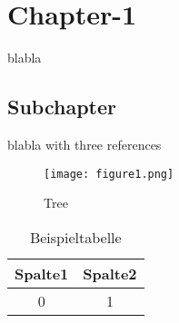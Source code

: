 
\section{Chapter-1}

blabla

\subsection{Subchapter}

blabla with three references\cite{ietf-ipfix-protocol,snoeren2001hash,belenky2003ip}

\begin{figure}[h]%
 	\begin{center}%
 		\texttt{[image: figure1.png]}%
 		\caption{Tree}\label{fig:baum}%
 	\end{center}%
\end{figure}

\begin{table}[h]%
 	\begin{center}%
		\caption{Beispieltabelle}\label{tab:example}%
	 	\begin{tabular}{c|c}%
 			Spalte1 & Spalte2\\
 			\hline
 			0 & 1\\
 		\end{tabular}%
 	\end{center}%
\end{table}
